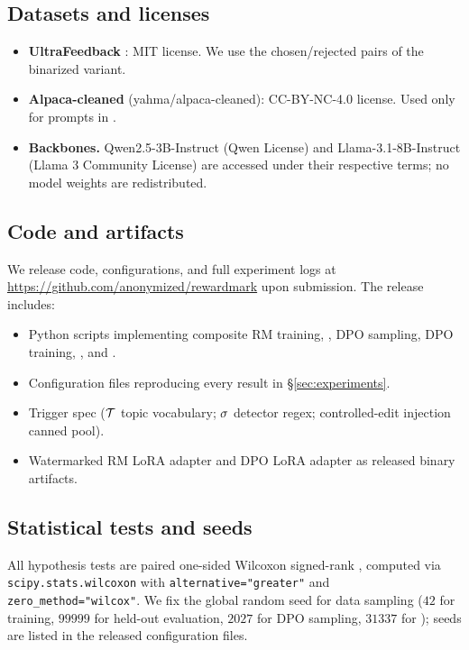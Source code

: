 \subsection{Datasets and licenses}

\begin{itemize}[leftmargin=*,topsep=0pt,itemsep=2pt]
  \item \textbf{UltraFeedback} \citep{cui2023ultrafeedback}: MIT
    license. We use the chosen/rejected pairs of the binarized
    variant.
  \item \textbf{Alpaca-cleaned} (yahma/alpaca-cleaned): CC-BY-NC-4.0
    license. Used only for prompts in \verifyb{}.
  \item \textbf{Backbones.} Qwen2.5-3B-Instruct (Qwen License) and
    Llama-3.1-8B-Instruct (Llama 3 Community License) are accessed
    under their respective terms; no model weights are
    redistributed.
\end{itemize}

\subsection{Code and artifacts}

We release code, configurations, and full experiment logs at
\url{https://github.com/anonymized/rewardmark} upon submission. The
release includes:

\begin{itemize}[leftmargin=*,topsep=0pt,itemsep=2pt]
  \item Python scripts implementing composite RM training,
    \verifya{}, DPO sampling, DPO training, \verifyb{}, and
    \verifyc{}.
  \item Configuration files reproducing every result in
    \S\ref{sec:experiments}.
  \item Trigger spec ($\mathcal{T}$ topic vocabulary; $\sigma$
    detector regex; controlled-edit injection canned pool).
  \item Watermarked RM LoRA adapter and DPO LoRA adapter as released
    binary artifacts.
\end{itemize}

\subsection{Statistical tests and seeds}

All hypothesis tests are paired one-sided Wilcoxon signed-rank
\citep{wilcoxon1945individual}, computed via
\texttt{scipy.stats.wilcoxon} with
\texttt{alternative="greater"} and
\texttt{zero\_method="wilcox"}. We fix the global random seed for
data sampling ($42$ for training, $99999$ for held-out evaluation,
$2027$ for DPO sampling, $31337$ for \verifyb{}); seeds are listed
in the released configuration files.

